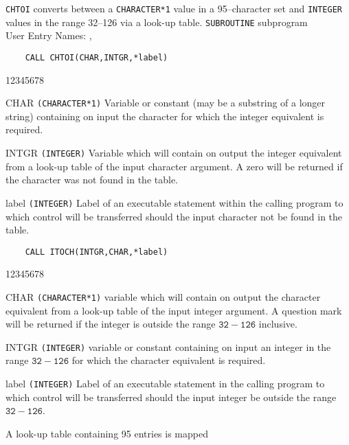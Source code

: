                      
                 
               
                   
{\tt CHTOI} converts between a {\tt CHARACTER*1} value in a
95--character set and {\tt INTEGER} values in the range 32--126 via a
look-up table.
\Structure
{\tt SUBROUTINE} subprogram \\
User Entry Names: , 
\Usage
\begin{verbatim}
    CALL CHTOI(CHAR,INTGR,*label)
\end{verbatim}
\begin{DLtt}{12345678}
\item [CHAR] {\tt (CHARACTER*1)} Variable or constant (may be a
substring of a longer string) containing on input the character for
which the integer equivalent is required.
\item [INTGR] {\tt (INTEGER)} Variable which will contain on output the
integer equivalent from a look-up table of the input character argument.
A zero will be returned if the character was not found in the table.
\item [label] {\tt (INTEGER)} Label of an executable statement within the
calling program to which control will be transferred should the input
character not be found in the table.
\end{DLtt}
\begin{verbatim}
    CALL ITOCH(INTGR,CHAR,*label)
\end{verbatim}
\begin{DLtt}{12345678}
\item [CHAR] {\tt (CHARACTER*1)} variable which will contain on output
the character equivalent from a look-up table of the input integer
argument. A question mark will be returned if the integer is outside the
range $\mathtt{32-126}$ inclusive.
\item [INTGR] {\tt (INTEGER)} variable or constant containing on input an
integer in the range $\mathtt{32-126}$ for which the character equivalent is
required.
\item [label] {\tt (INTEGER)} Label of an executable statement in the
calling program to which control will be transferred should the input
integer be outside the range $\mathtt{32-126}$.
\end{DLtt}
\Method
A look-up table containing 95 entries is mapped
